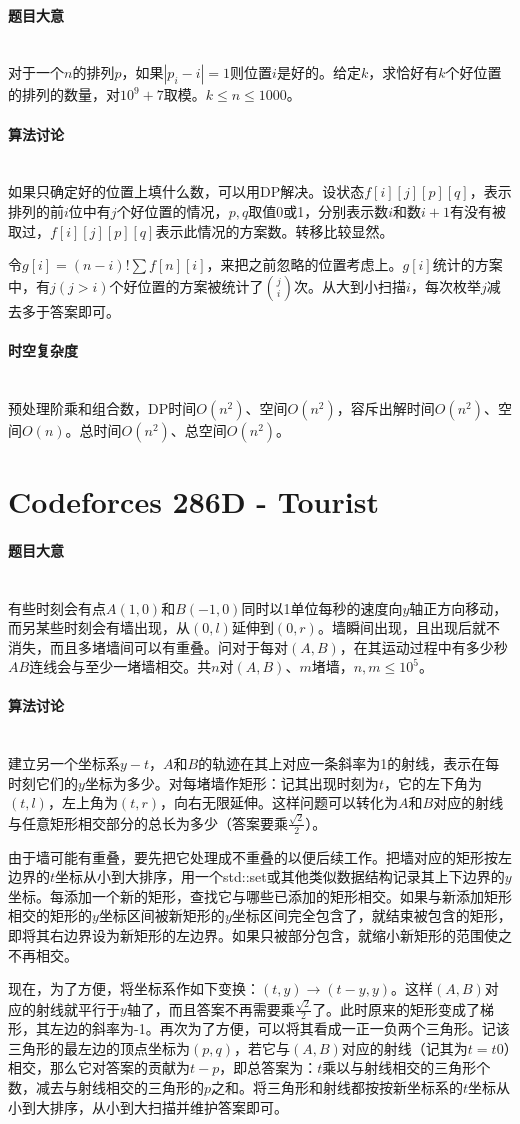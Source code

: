 \documentclass[UTF8]{ctexart}
\newcommand{\myparagraph}[1]{\paragraph{#1}\mbox{}\\}
\theoremstyle{nonumberplain}
\begin{document}
		\myparagraph{题目大意}
		
			对于一个$n$的排列$p$，如果$|p_i-i|=1$则位置$i$是好的。给定$k$，求恰好有$k$个好位置的排列的数量，对$10^9+7$取模。$k \leq n \leq 1000$。
		
		\myparagraph{算法讨论}
		
			如果只确定好的位置上填什么数，可以用DP解决。设状态$f[i][j][p][q]$，表示排列的前$i$位中有$j$个好位置的情况，$p,q$取值0或1，分别表示数$i$和数$i+1$有没有被取过，$f[i][j][p][q]$表示此情况的方案数。转移比较显然。
			
			令$g[i]=(n-i)! \sum f[n][i]$，来把之前忽略的位置考虑上。$g[i]$统计的方案中，有$j(j>i)$个好位置的方案被统计了$\binom{j}{i}$次。从大到小扫描$i$，每次枚举$j$减去多于答案即可。
		
		\myparagraph{时空复杂度}
		
			预处理阶乘和组合数，DP时间$O(n^2)$、空间$O(n^2)$，容斥出解时间$O(n^2)$、空间$O(n)$。总时间$O(n^2)$、总空间$O(n^2)$。
	
	\section{Codeforces 286D - Tourist}
	
		\myparagraph{题目大意}
		
			有些时刻会有点$A(1,0)$和$B(-1,0)$同时以1单位每秒的速度向$y$轴正方向移动，而另某些时刻会有墙出现，从$(0,l)$延伸到$(0,r)$。墙瞬间出现，且出现后就不消失，而且多堵墙间可以有重叠。问对于每对$(A,B)$，在其运动过程中有多少秒$AB$连线会与至少一堵墙相交。共$n$对$(A,B)$、$m$堵墙，$n,m \leq 10^5$。
		
		\myparagraph{算法讨论}
		
			建立另一个坐标系$y-t$，$A$和$B$的轨迹在其上对应一条斜率为1的射线，表示在每时刻它们的$y$坐标为多少。对每堵墙作矩形：记其出现时刻为$t$，它的左下角为$(t,l)$，左上角为$(t,r)$，向右无限延伸。这样问题可以转化为$A$和$B$对应的射线与任意矩形相交部分的总长为多少（答案要乘$\frac{\sqrt{2}}{2}$）。
			
			由于墙可能有重叠，要先把它处理成不重叠的以便后续工作。把墙对应的矩形按左边界的$t$坐标从小到大排序，用一个std::set或其他类似数据结构记录其上下边界的$y$坐标。每添加一个新的矩形，查找它与哪些已添加的矩形相交。如果与新添加矩形相交的矩形的$y$坐标区间被新矩形的$y$坐标区间完全包含了，就结束被包含的矩形，即将其右边界设为新矩形的左边界。如果只被部分包含，就缩小新矩形的范围使之不再相交。
			
			现在，为了方便，将坐标系作如下变换：$(t,y) \to (t-y,y)$。这样$(A,B)$对应的射线就平行于$y$轴了，而且答案不再需要乘$\frac{\sqrt{2}}{2}$了。此时原来的矩形变成了梯形，其左边的斜率为-1。再次为了方便，可以将其看成一正一负两个三角形。记该三角形的最左边的顶点坐标为$(p,q)$，若它与$(A,B)$对应的射线（记其为$t=t0$）相交，那么它对答案的贡献为$t-p$，即总答案为：$t$乘以与射线相交的三角形个数，减去与射线相交的三角形的$p$之和。将三角形和射线都按按新坐标系的$t$坐标从小到大排序，从小到大扫描并维护答案即可。
		
\end{document}

